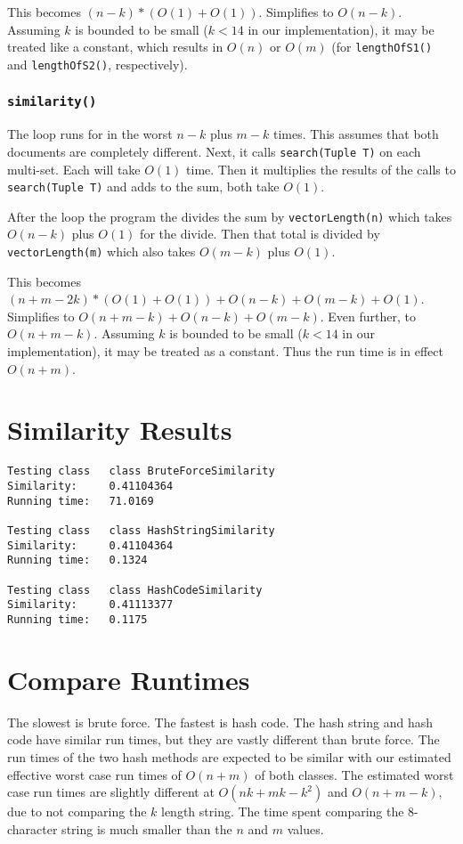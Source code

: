 \documentclass[10pt,letterpaper]{article}
\begin{document}
This becomes $(n-k)*(O(1)+O(1))$. Simplifies to $O(n-k)$. Assuming $k$ is bounded to be small ($k<14$ in our implementation), it may be treated like a constant, which results in $O(n)$ or $O(m)$ (for \texttt{lengthOfS1()} and \texttt{lengthOfS2()}, respectively).
\subsubsection{\texttt{similarity()}}
The loop runs for in the worst $n-k$ plus $m-k$ times. This assumes that both documents are completely different. Next, it calls \texttt{search(Tuple T)} on each multi-set. Each will take $O(1)$ time. Then it multiplies the results of the calls to \texttt{search(Tuple T)} and adds to the sum, both take $O(1)$.

After the loop the program the divides the sum by \texttt{vectorLength(n)} which takes $O(n-k)$ plus $O(1)$ for the divide. Then that total is divided by \texttt{vectorLength(m)} which also takes $O(m-k)$ plus $O(1)$.

This becomes $(n+m-2k)*(O(1)+O(1))+O(n-k)+O(m-k)+O(1)$. Simplifies to $O(n+m-k)+O(n-k)+O(m-k)$. Even further, to $O(n+m-k)$. Assuming $k$ is bounded to be small ($k<14$ in our implementation), it may be treated as a constant. Thus the run time is in effect $O(n+m)$.
\section{Similarity Results}
\begin{verbatim}
Testing class   class BruteForceSimilarity
Similarity:     0.41104364
Running time:   71.0169

Testing class   class HashStringSimilarity
Similarity:     0.41104364
Running time:   0.1324

Testing class   class HashCodeSimilarity
Similarity:     0.41113377
Running time:   0.1175
\end{verbatim}
\section{Compare Runtimes}
The slowest is brute force. The fastest is hash code. The hash string and hash code have similar run times, but they are vastly different than brute force. The run times of the two hash methods are expected to be similar with our estimated effective worst case run times of $O(n+m)$ of both classes. The estimated worst case run times are slightly different at $O(nk+mk-k^2)$ and $O(n+m-k)$, due to not comparing the $k$ length string. The time spent comparing the 8-character string is much smaller than the $n$ and $m$ values.
\end{document}
